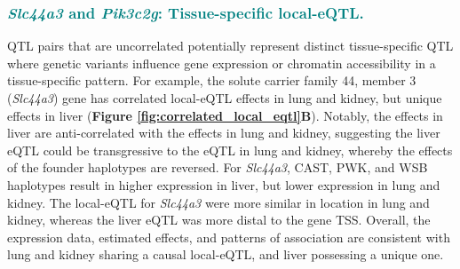 \documentclass[9pt,twocolumn,twoside]{gsajnl}
\newcommand{\GKinline}[1]{\textcolor{teal}{#1}}
\begin{document}
\subsubsection{\GKinline{\textit{Slc44a3} and \textit{Pik3c2g}: Tissue-specific local-eQTL.}}
QTL pairs that are uncorrelated potentially represent distinct tissue-specific QTL where genetic variants influence gene expression or chromatin accessibility in a tissue-specific pattern. For example, the solute carrier family 44, member 3 (\textit{Slc44a3}) gene has correlated local-eQTL effects in lung and kidney, but unique effects in liver (\textbf{Figure \ref{fig:correlated_local_eqtl}B}). Notably, the effects in liver are anti-correlated with the effects in lung and kidney, suggesting the liver eQTL could be transgressive \citep{Rieseberg1999} to the eQTL in lung and kidney, whereby the effects of the founder haplotypes are reversed. For \textit{Slc44a3}, CAST, PWK, and WSB haplotypes result in higher expression in liver, but lower expression in lung and kidney. 
The local-eQTL for \textit{Slc44a3} were more similar in location in lung and kidney, whereas the liver eQTL was more distal to the gene TSS. Overall, the expression data, estimated effects, and patterns of association are consistent with lung and kidney sharing a causal local-eQTL, and liver possessing a unique one. 
\end{document}
